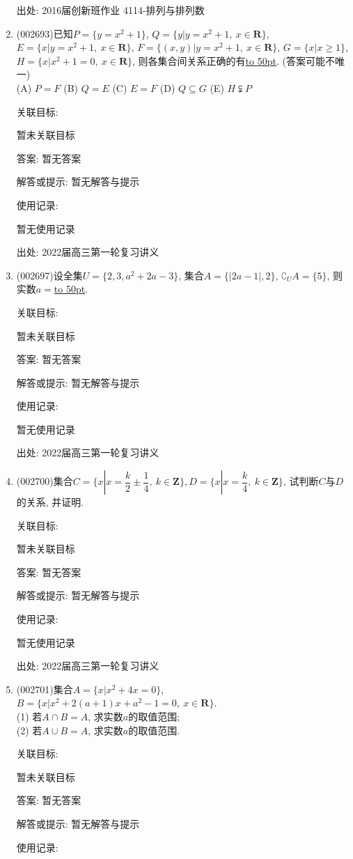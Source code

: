 \documentclass[10pt,a4paper]{article}
\newcommand{\blank}[1]{\underline{\hbox to #1pt{}}}
\begin{document}
\begin{enumerate}[1.]
出处: 2016届创新班作业	4114-排列与排列数
\item { (002693)}已知$P=\{y=x^2+1\}$, $Q=\{y|y=x^2+1, \ x\in \mathbf{R}\}$, $E=\{x|y=x^2+1, \  x\in \mathbf{R}\}$, $F=\{(x,y)|y=x^2+1, \ x\in \mathbf{R}\}$, $G=\{x|x\ge 1\}$, $H=\{x|x^2+1=0, \ x\in \mathbf{R}\}$, 则各集合间关系正确的有\blank{50}. (答案可能不唯一)\\
(A) $P=F$   (B) $Q=E$   (C) $E=F$   (D) $Q\subseteq G$  (E) $H\subsetneqq P$


关联目标:

暂未关联目标

答案: 暂无答案

解答或提示: 暂无解答与提示

使用记录:

暂无使用记录


出处: 2022届高三第一轮复习讲义
\item { (002697)}设全集$U=\{2,3,a^2+2a-3\}$, 集合$A=\{|2a-1|,2\}$, $\complement_U A=\{5\}$, 则实数$a=$\blank{50}.


关联目标:

暂未关联目标

答案: 暂无答案

解答或提示: 暂无解答与提示

使用记录:

暂无使用记录


出处: 2022届高三第一轮复习讲义
\item { (002700)}集合$C=\{x|x=\dfrac k2\pm \dfrac14, \ k\in \mathbf{Z}\},D=\{x|x=\dfrac k4,\ k\in \mathbf{Z}\}$, 试判断$C$与$D$的关系, 并证明.


关联目标:

暂未关联目标

答案: 暂无答案

解答或提示: 暂无解答与提示

使用记录:

暂无使用记录


出处: 2022届高三第一轮复习讲义
\item { (002701)}集合$A=\{x|x^2+4x=0\}$, $B=\{x|x^2+2(a+1)x+a^2-1=0,\ x\in \mathbf{R}\}$.\\
(1) 若$A\cap B=A$, 求实数$a$的取值范围;\\
(2) 若$A\cup B=A$, 求实数$a$的取值范围.


关联目标:

暂未关联目标

答案: 暂无答案

解答或提示: 暂无解答与提示

使用记录:


\end{enumerate}
\end{document}
